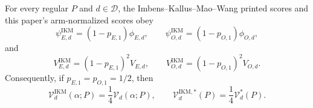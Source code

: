 For every regular \(P\) and \(d\in\mathcal D\), the Imbens--Kallus--Mao--Wang printed scores and this paper's arm-normalized scores obey
\[
 \psi_{E,d}^{\mathrm{IKM}}=(1-p_{E,1})\phi_{E,d},
 \qquad
 \psi_{O,d}^{\mathrm{IKM}}=(1-p_{O,1})\phi_{O,d},
\]
and
\[
 V_{E,d}^{\mathrm{IKM}}=(1-p_{E,1})^2V_{E,d},
 \qquad
 V_{O,d}^{\mathrm{IKM}}=(1-p_{O,1})^2V_{O,d}.
\]
Consequently, if \(p_{E,1}=p_{O,1}=1/2\), then
\[
 \mathcal V_d^{\mathrm{IKM}}(\alpha;P)=\frac14\mathcal V_d(\alpha;P),
 \qquad
 \mathcal V_d^{\mathrm{IKM},*}(P)=\frac14\mathcal V_d^*(P).
\]